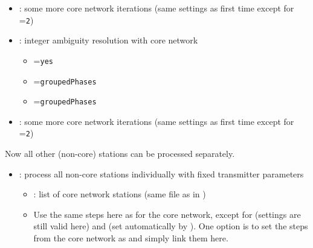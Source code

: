 \begin{itemize}
\begin{itemize}
  \end{itemize}
  \item {}: some more core network iterations
        (same settings as first time except for =\verb|2|)
  \item {}: integer
        ambiguity resolution with core network
  \begin{itemize}
    \item {}=\verb|yes|
    \item {}=\verb|groupedPhases|
    \item {}=\verb|groupedPhases|
  \end{itemize}
  \item {}: some more core network iterations
        (same settings as first time except for =\verb|2|)
\end{itemize}

Now all other (non-core) stations can be processed separately.
\begin{itemize}
  \item {}:
        process all non-core stations individually with fixed transmitter parameters
  \begin{itemize}
    \item {}: list of core network stations (same file as
     in
    )
    \item Use the same steps here as for the core network, except for
           (settings are still valid here)
          and  (set automatically
          by ). One option
          is to set the steps from the core network as  
          and simply link them here.
  \end{itemize}
\end{itemize}


